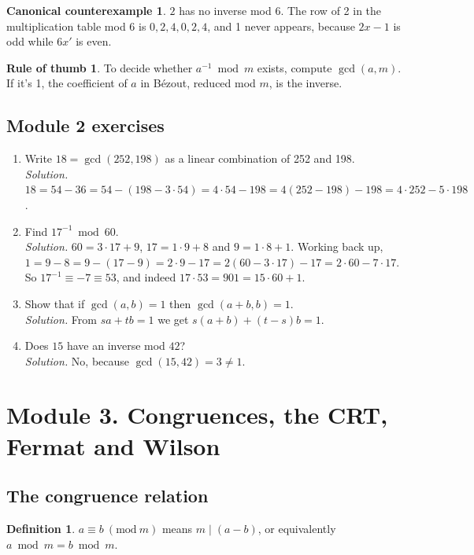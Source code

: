 \documentclass[11pt,a4paper]{article}
\theoremstyle{definition}
\newtheorem{definition}[theorem]{Definition}
\newcommand{\md}[1]{\ (\mathrm{mod}\ #1)}
\theoremstyle{noteit}
\theoremstyle{note}
\newtheorem*{counter}{Canonical counterexample}
\newtheorem*{thumbrule}{Rule of thumb}
\begin{document}
\begin{counter}
$2$ has no inverse mod $6$. The row of 2 in the multiplication table mod 6 is $0,2,4,0,2,4$, and 1 never appears, because $2x-1$ is odd while $6x'$ is even.
\end{counter}

\begin{thumbrule}
To decide whether $a^{-1}\bmod m$ exists, compute $\gcd(a,m)$. If it's 1, the coefficient of $a$ in Bézout, reduced mod $m$, is the inverse.
\end{thumbrule}

\subsection*{Module 2 exercises}
\begin{enumerate}[label=\textbf{2.\arabic*}]
\item Write $18=\gcd(252,198)$ as a linear combination of 252 and 198.\\
\emph{Solution.} $18=54-36=54-(198-3\cdot54)=4\cdot54-198=4(252-198)-198=4\cdot252-5\cdot198$.
\item Find $17^{-1}\bmod 60$.\\
\emph{Solution.} $60=3\cdot17+9$, $17=1\cdot9+8$ and $9=1\cdot8+1$. Working back up, $1=9-8=9-(17-9)=2\cdot9-17=2(60-3\cdot17)-17=2\cdot60-7\cdot17$. So $17^{-1}\equiv-7\equiv53$, and indeed $17\cdot53=901=15\cdot60+1$.
\item Show that if $\gcd(a,b)=1$ then $\gcd(a+b,b)=1$.\\
\emph{Solution.} From $sa+tb=1$ we get $s(a+b)+(t-s)b=1$.
\item Does $15$ have an inverse mod $42$?\\
\emph{Solution.} No, because $\gcd(15,42)=3\neq1$.
\end{enumerate}

\newpage
\section{Module 3. Congruences, the CRT, Fermat and Wilson}

\subsection{The congruence relation}

\begin{definition}
$a\equiv b\md m$ means $m\mid(a-b)$, or equivalently $a\bmod m=b\bmod m$.
\end{definition}
\end{document}
